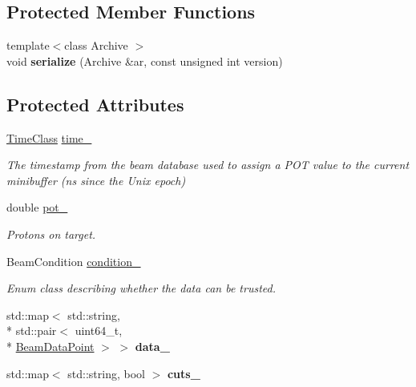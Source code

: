 \subsection*{Protected Member Functions}
\begin{DoxyCompactItemize}
\item 
\hypertarget{classBeamStatus_ad7450d8c7fd19ab5020381dca6f801e8}{{\footnotesize template$<$class Archive $>$ }\\void {\bfseries serialize} (Archive \&ar, const unsigned int version)}\label{classBeamStatus_ad7450d8c7fd19ab5020381dca6f801e8}

\end{DoxyCompactItemize}
\subsection*{Protected Attributes}
\begin{DoxyCompactItemize}
\item 
\hyperlink{classTimeClass}{Time\-Class} \hyperlink{classBeamStatus_a499b220ec0c80ce883d19f8f9520934d}{time\-\_\-}
\begin{DoxyCompactList}\small\item\em The timestamp from the beam database used to assign a P\-O\-T value to the current minibuffer (ns since the Unix epoch) \end{DoxyCompactList}\item 
\hypertarget{classBeamStatus_ab4d86e7e924a02a73324105931e5bdc5}{double \hyperlink{classBeamStatus_ab4d86e7e924a02a73324105931e5bdc5}{pot\-\_\-}}\label{classBeamStatus_ab4d86e7e924a02a73324105931e5bdc5}

\begin{DoxyCompactList}\small\item\em Protons on target. \end{DoxyCompactList}\item 
Beam\-Condition \hyperlink{classBeamStatus_a8e81a7fca77f64c2ce0e41bd0e14c3ea}{condition\-\_\-}
\begin{DoxyCompactList}\small\item\em Enum class describing whether the data can be trusted. \end{DoxyCompactList}\item 
\hypertarget{classBeamStatus_a784e81454e78fc90f3c8206d68cae144}{std\-::map$<$ std\-::string, \\*
std\-::pair$<$ uint64\-\_\-t, \\*
\hyperlink{structBeamDataPoint}{Beam\-Data\-Point} $>$ $>$ {\bfseries data\-\_\-}}\label{classBeamStatus_a784e81454e78fc90f3c8206d68cae144}

\item 
\hypertarget{classBeamStatus_aff0365d2d921712d77e96fabfbcebdc3}{std\-::map$<$ std\-::string, bool $>$ {\bfseries cuts\-\_\-}}\label{classBeamStatus_aff0365d2d921712d77e96fabfbcebdc3}

\end{DoxyCompactItemize}
